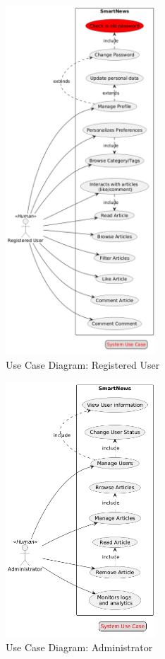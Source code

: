 \begin{figure}[!h]
    \centering
    \includegraphics[width=0.5\textwidth]{chapters/chapter_02/use-case-smart-news-registered-user}
    \caption{Use Case Diagram: Registered User}
    \label{fig:use-case-diagram-registered-user}
\end{figure}


\begin{figure}[!h]
    \centering
    \includegraphics[width=0.5\textwidth]{chapters/chapter_02/use-case-smart-news-administrator}
    \caption{Use Case Diagram: Administrator}
    \label{fig:use-case-diagram-administrator}
\end{figure}


